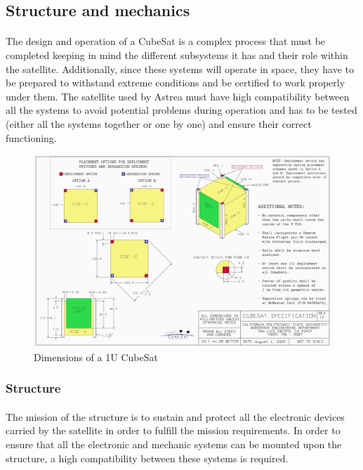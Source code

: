 \subsection{Structure and mechanics}

\paragraph{}The design and operation of a CubeSat is a complex process that must be completed keeping in mind the different subsystems it has and their role within the satellite. Additionally, since these systems will operate in space, they have to be prepared to withstand extreme conditions and be certified to work properly under them. The satellite used by Astrea must have high compatibility between all the systems to avoid potential problems during operation and has to be tested (either all the systems together or one by one) and ensure their correct functioning.


\begin{figure}[h]
\includegraphics[scale=0.6]{./sections/SatelliteDesign/images/CubeSatDesign}
\centering
\caption{Dimensions of a 1U CubeSat \cite{cubesatdimensions}}
\end{figure}

\subsubsection{Structure}

\paragraph{}The mission of the structure is to sustain and protect all the electronic devices carried by the satellite in order to fulfill the mission requirements. In order to ensure that all the electronic and mechanic systems can be mounted upon the structure, a high compatibility between these systems is required.

